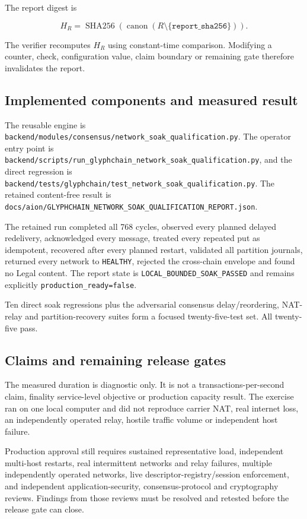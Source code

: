 The report digest is

\begin{equation}
  H_R = \operatorname{SHA256}\!\left(
    \operatorname{canon}(R \setminus \{\texttt{report\_sha256}\})
  \right).
\end{equation}

The verifier recomputes $H_R$ using constant-time comparison.  Modifying a
counter, check, configuration value, claim boundary or remaining gate therefore
invalidates the report.

\subsection{Implemented components and measured result}

The reusable engine is
\texttt{backend/modules/consensus/network\_soak\_qualification.py}.  The
operator entry point is
\texttt{backend/scripts/run\_glyphchain\_network\_soak\_qualification.py}, and
the direct regression is
\texttt{backend/tests/glyphchain/test\_network\_soak\_qualification.py}.  The
retained content-free result is
\texttt{docs/aion/GLYPHCHAIN\_NETWORK\_SOAK\_QUALIFICATION\_REPORT.json}.

The retained run completed all 768 cycles, observed every planned delayed
redelivery, acknowledged every message, treated every repeated put as
idempotent, recovered after every planned restart, validated all partition
journals, returned every network to \texttt{HEALTHY}, rejected the cross-chain
envelope and found no Legal content.  The report state is
\texttt{LOCAL\_BOUNDED\_SOAK\_PASSED} and remains explicitly
\texttt{production\_ready=false}.

Ten direct soak regressions plus the adversarial consensus delay/reordering,
NAT-relay and partition-recovery suites form a focused twenty-five-test set.
All twenty-five pass.

\subsection{Claims and remaining release gates}

The measured duration is diagnostic only.  It is not a transactions-per-second
claim, finality service-level objective or production capacity result.  The
exercise ran on one local computer and did not reproduce carrier NAT, real
internet loss, an independently operated relay, hostile traffic volume or
independent host failure.

Production approval still requires sustained representative load, independent
multi-host restarts, real intermittent networks and relay failures, multiple
independently operated networks, live descriptor-registry/session enforcement,
and independent application-security, consensus-protocol and cryptography
reviews.  Findings from those reviews must be resolved and retested before the
release gate can close.

